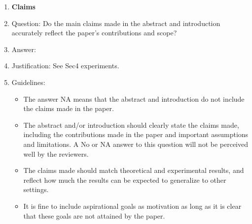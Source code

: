 \documentclass{article}
\begin{document}
\begin{enumerate}

\item {\bf Claims}
    \item[] Question: Do the main claims made in the abstract and introduction accurately reflect the paper's contributions and scope?
    \item[] Answer: \answerYes{} %
    \item[] Justification: See Sec4 experiments.
    \item[] Guidelines:
    \begin{itemize}
        \item The answer NA means that the abstract and introduction do not include the claims made in the paper.
        \item The abstract and/or introduction should clearly state the claims made, including the contributions made in the paper and important assumptions and limitations. A No or NA answer to this question will not be perceived well by the reviewers. 
        \item The claims made should match theoretical and experimental results, and reflect how much the results can be expected to generalize to other settings. 
        \item It is fine to include aspirational goals as motivation as long as it is clear that these goals are not attained by the paper. 
    \end{itemize}


\end{enumerate}
\end{document}
